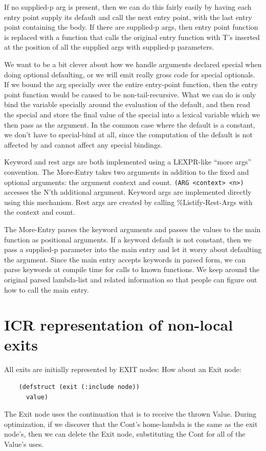 If no supplied-p arg is present, then we can do this fairly easily by having
each entry point supply its default and call the next entry point, with the
last entry point containing the body.  If there are supplied-p args, then entry
point function is replaced with a function that calls the original entry
function with T's inserted at the position of all the supplied args with
supplied-p parameters.

We want to be a bit clever about how we handle arguments declared special when
doing optional defaulting, or we will emit really gross code for special
optionals.  If we bound the arg specially over the entire entry-point function,
then the entry point function would be caused to be non-tail-recursive.  What
we can do is only bind the variable specially around the evaluation of the
default, and then read the special and store the final value of the special
into a lexical variable which we then pass as the argument.  In the common case
where the default is a constant, we don't have to special-bind at all, since
the computation of the default is not affected by and cannot affect any special
bindings.

Keyword and rest args are both implemented using a LEXPR-like ``more
args'' convention.  The More-Entry takes two arguments in addition to
the fixed and optional arguments: the argument context and count.
\verb+(ARG <context> <n>)+ accesses the N'th additional argument.  Keyword
args are implemented directly using this mechanism.  Rest args are
created by calling \%Listify-Rest-Args with the context and count.

The More-Entry parses the keyword arguments and passes the values to the main
function as positional arguments.  If a keyword default is not constant, then
we pass a supplied-p parameter into the main entry and let it worry about
defaulting the argument.  Since the main entry accepts keywords in parsed form,
we can parse keywords at compile time for calls to known functions.  We keep
around the original parsed lambda-list and related information so that people
can figure out how to call the main entry.

\section{ICR representation of non-local exits}

All exits are initially represented by EXIT nodes:
How about an Exit node:
\begin{verbatim}
    (defstruct (exit (:include node))
      value)
\end{verbatim}
The Exit node uses the continuation that is to receive the thrown Value.
During optimization, if we discover that the Cont's home-lambda is the same as
the exit node's, then we can delete the Exit node, substituting the Cont for
all of the Value's uses.

